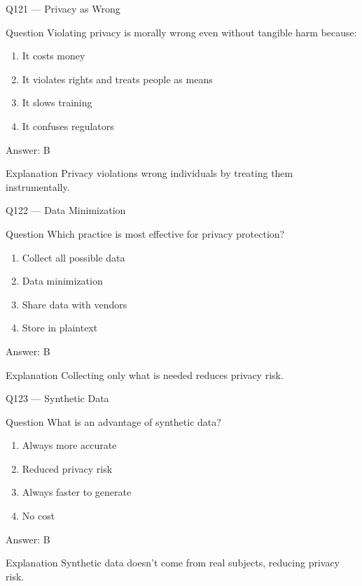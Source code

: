 \documentclass[aspectratio=169,8pt]{beamer}
\begin{document}
	\begin{frame}{Q121 --- Privacy as Wrong}
		\begin{block}{Question}
			Violating privacy is morally wrong even without tangible harm because:
		\end{block}
		\begin{enumerate}
			\item It costs money
			\item It violates rights and treats people as means
			\item It slows training
			\item It confuses regulators
		\end{enumerate}
		\begin{exampleblock}{Answer: B}\end{exampleblock}
		\begin{block}{Explanation}
			Privacy violations wrong individuals by treating them instrumentally.
		\end{block}
	\end{frame}
	
	\begin{frame}{Q122 --- Data Minimization}
		\begin{block}{Question}
			Which practice is most effective for privacy protection?
		\end{block}
		\begin{enumerate}
			\item Collect all possible data
			\item Data minimization
			\item Share data with vendors
			\item Store in plaintext
		\end{enumerate}
		\begin{exampleblock}{Answer: B}\end{exampleblock}
		\begin{block}{Explanation}
			Collecting only what is needed reduces privacy risk.
		\end{block}
	\end{frame}
	
	\begin{frame}{Q123 --- Synthetic Data}
		\begin{block}{Question}
			What is an advantage of synthetic data?
		\end{block}
		\begin{enumerate}
			\item Always more accurate
			\item Reduced privacy risk
			\item Always faster to generate
			\item No cost
		\end{enumerate}
		\begin{exampleblock}{Answer: B}\end{exampleblock}
		\begin{block}{Explanation}
			Synthetic data doesn't come from real subjects, reducing privacy risk.
		\end{block}
	\end{frame}
	
\end{document}
